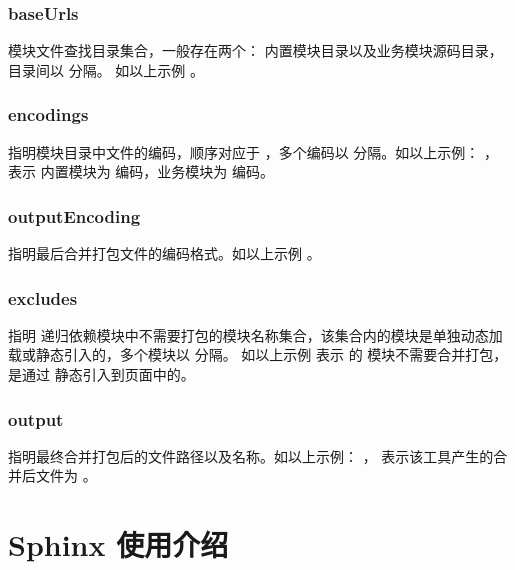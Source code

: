 \documentclass[letterpaper,10pt,english]{sphinxmanual}
\begin{document}
\subsubsection{baseUrls}
\label{tools/module-compiler/usage:baseurls}
模块文件查找目录集合，一般存在两个：  内置模块目录以及业务模块源码目录，目录间以 \code{,} 分隔。
如以上示例  。


\subsubsection{encodings}
\label{tools/module-compiler/usage:encodings}
指明模块目录中文件的编码，顺序对应于  ，多个编码以 \code{,} 分隔。如以上示例：  ，
表示  内置模块为  编码，业务模块为  编码。


\subsubsection{outputEncoding}
\label{tools/module-compiler/usage:outputencoding}
指明最后合并打包文件的编码格式。如以上示例  。


\subsubsection{excludes}
\label{tools/module-compiler/usage:excludes}
指明  递归依赖模块中不需要打包的模块名称集合，该集合内的模块是单独动态加载或静态引入的，多个模块以 \code{,} 分隔。
如以上示例  表示  的  模块不需要合并打包，是通过  静态引入到页面中的。


\subsubsection{output}
\label{tools/module-compiler/usage:output}
指明最终合并打包后的文件路径以及名称。如以上示例：  ，
表示该工具产生的合并后文件为  。


\section{Sphinx 使用介绍}
\label{tools/use-sphinx:sphinx}\label{tools/use-sphinx::doc}\label{tools/use-sphinx:usesphinx}
\end{document}
